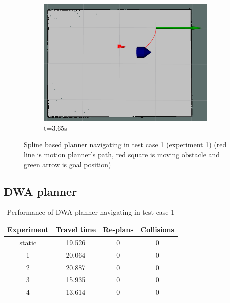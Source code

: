 \begin{figure}[ht]
\begin{subfigure}[b]{0.30\linewidth}
        \includegraphics[width=0.95\textwidth]{images/spline_single_1_obs/1/5365.png}
        \caption{t=3.65s}
    \end{subfigure}
    \caption{Spline based planner navigating in test case 1 (experiment 1) (red line is motion
    planner's path, red square is moving obstacle and green arrow is goal position)}\label{fig:spline_test_case_1_exp_1}
\end{figure}

\subsection{DWA planner}%
\label{sub:eval_dwa_planner}

\begin{table}[H]
    \centering
    \begin{tabular}{cccc}
        \textbf{Experiment} & \textbf{Travel time} & \textbf{Re-plans} & \textbf{Collisions} \\\toprule
        static & 19.526 & 0 & 0 \\
             1 & 20.064 & 0 & 0 \\
             2 & 20.887 & 0 & 0 \\
             3 & 15.935 & 0 & 0 \\
             4 & 13.614 & 0 & 0 \\
    \end{tabular}
    \caption{Performance of DWA planner navigating in test case 1}\label{tab:perfomance_dwa_test_case_1}
\end{table}

